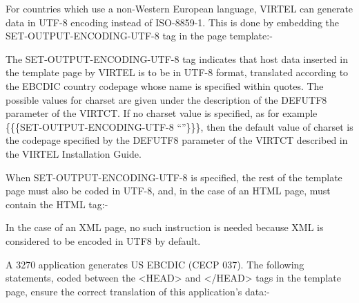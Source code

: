 \documentclass[letterpaper,10pt,english]{sphinxmanual}
\begin{document}

For countries which use a non-Western European language, VIRTEL can generate data in UTF-8 encoding instead of
ISO-8859-1. This is done by embedding the SET-OUTPUT-ENCODING-UTF-8 tag in the page template:-

\begin{sphinxVerbatim}[commandchars=\\\{\}]
   
\end{sphinxVerbatim}

The SET-OUTPUT-ENCODING-UTF-8 tag indicates that host data inserted in the template page by VIRTEL is to be in UTF-8 format, translated according to the EBCDIC country codepage whose name is specified within quotes. The possible values for charset are given under the description of the DEFUTF8 parameter of the VIRTCT. If no charset value is specified, as for example \{\{\{SET-OUTPUT-ENCODING-UTF-8 “”\}\}\}, then the default value of charset is the codepage
specified by the DEFUTF8 parameter of the VIRTCT described in the VIRTEL Installation Guide.

When SET-OUTPUT-ENCODING-UTF-8 is specified, the rest of the template page must also be coded in UTF-8, and, in the case of an HTML page, must contain the HTML tag:-

\begin{sphinxVerbatim}[commandchars=\\\{\}]
  
\end{sphinxVerbatim}

In the case of an XML page, no such instruction is needed because XML is considered to be encoded in UTF8 by default.


A 3270 application generates US EBCDIC (CECP 037). The following statements, coded between the \textless{}HEAD\textgreater{} and \textless{}/HEAD\textgreater{} tags in the template page, ensure the correct translation of this application’s data:-
\end{document}
